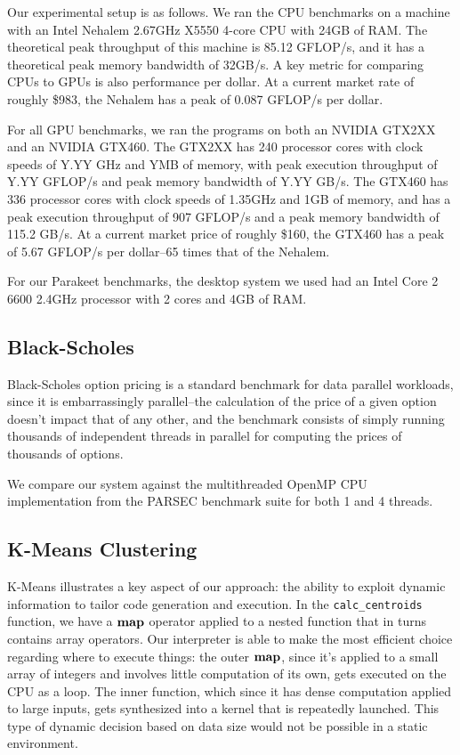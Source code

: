 \documentclass[preprint]{sigplanconf}
\begin{document}
Our experimental setup is as follows.  We ran the CPU benchmarks on a machine
with an Intel Nehalem 2.67GHz X5550 4-core CPU with 24GB of RAM.  The
theoretical peak throughput of this machine is 85.12 GFLOP/s, and it has a
theoretical peak memory bandwidth of 32GB/s.  A key metric for comparing CPUs
to GPUs is also performance per dollar.  At a current market rate of roughly
\$983, the Nehalem has a peak of 0.087 GFLOP/s per dollar.

For all GPU benchmarks, we ran the programs on both an NVIDIA GTX2XX and an
NVIDIA GTX460.  The GTX2XX has 240 processor cores with clock speeds of
Y.YY GHz and YMB of memory, with peak execution throughput of Y.YY GFLOP/s and
peak memory bandwidth of Y.YY GB/s.  The GTX460 has 336 processor cores with
clock speeds of 1.35GHz and 1GB of memory, and has a peak execution throughput
of 907 GFLOP/s and a peak memory bandwidth of 115.2 GB/s.  At a current market
price of roughly \$160, the GTX460 has a peak of 5.67 GFLOP/s per dollar--65
times that of the Nehalem.

For our Parakeet benchmarks, the desktop system we used had an Intel Core 2 6600
2.4GHz processor with 2 cores and 4GB of RAM.

\subsection{Black-Scholes}
Black-Scholes option pricing \cite{Blac73} is a standard benchmark for data
parallel workloads, since it is embarrassingly parallel--the calculation of the
price of a given option doesn't impact that of any other, and the benchmark
consists of simply running thousands of independent threads in parallel for
computing the prices of thousands of options.

We compare our system against the multithreaded OpenMP CPU implementation
from the PARSEC \cite{Bien08} benchmark suite for both 1 and 4 threads.

\subsection{K-Means Clustering}


K-Means illustrates a key aspect of our approach: the ability to exploit
dynamic information to tailor code generation and execution.  In the
\texttt{calc\_centroids} function, we have a $\mbox{\textbf{map}}$ operator applied to a
nested function that in turns contains array operators.  Our interpreter is
able to make the most efficient choice regarding where to execute things: the
outer $\mbox{\textbf{map}}$, since it's applied to a small array of integers and involves
little computation of its own, gets executed on the CPU as a loop.  The inner
function, which since it has dense computation applied to large inputs, gets
synthesized into a kernel that is repeatedly launched.  This type of dynamic
decision based on data size would not be possible in a static environment.
\end{document}
